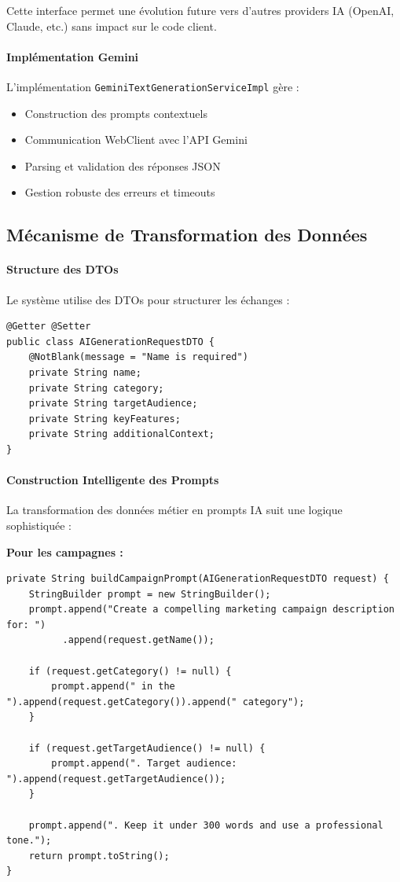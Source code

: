 Cette interface permet une évolution future vers d'autres providers IA (OpenAI, Claude, etc.) sans impact sur le code client.

\paragraph{Implémentation Gemini}
L'implémentation \texttt{GeminiTextGenerationServiceImpl} gère :
\begin{itemize}[label=\textbullet]
    \item Construction des prompts contextuels
    \item Communication WebClient avec l'API Gemini
    \item Parsing et validation des réponses JSON
    \item Gestion robuste des erreurs et timeouts
\end{itemize}

\subsection{Mécanisme de Transformation des Données}

\paragraph{Structure des DTOs}
Le système utilise des DTOs pour structurer les échanges :
\begin{verbatim}
@Getter @Setter
public class AIGenerationRequestDTO {
    @NotBlank(message = "Name is required")
    private String name;
    private String category;
    private String targetAudience;
    private String keyFeatures;
    private String additionalContext;
}
\end{verbatim}

\paragraph{Construction Intelligente des Prompts}
La transformation des données métier en prompts IA suit une logique sophistiquée :

\textbf{Pour les campagnes :}
\begin{verbatim}
private String buildCampaignPrompt(AIGenerationRequestDTO request) {
    StringBuilder prompt = new StringBuilder();
    prompt.append("Create a compelling marketing campaign description for: ")
          .append(request.getName());

    if (request.getCategory() != null) {
        prompt.append(" in the ").append(request.getCategory()).append(" category");
    }

    if (request.getTargetAudience() != null) {
        prompt.append(". Target audience: ").append(request.getTargetAudience());
    }

    prompt.append(". Keep it under 300 words and use a professional tone.");
    return prompt.toString();
}
\end{verbatim}

